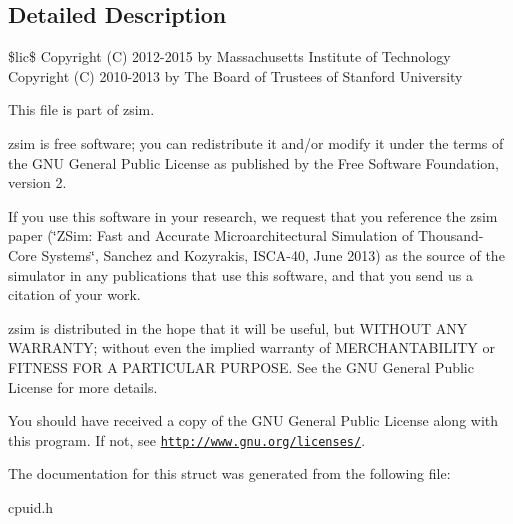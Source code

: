 \subsection{Detailed Description}
\$lic\$ Copyright (C) 2012-\/2015 by Massachusetts Institute of Technology Copyright (C) 2010-\/2013 by The Board of Trustees of Stanford University

This file is part of zsim.

zsim is free software; you can redistribute it and/or modify it under the terms of the G\-N\-U General Public License as published by the Free Software Foundation, version 2.

If you use this software in your research, we request that you reference the zsim paper (\char`\"{}\-Z\-Sim\-: Fast and Accurate Microarchitectural Simulation of
\-Thousand-\/\-Core Systems\char`\"{}, Sanchez and Kozyrakis, I\-S\-C\-A-\/40, June 2013) as the source of the simulator in any publications that use this software, and that you send us a citation of your work.

zsim is distributed in the hope that it will be useful, but W\-I\-T\-H\-O\-U\-T A\-N\-Y W\-A\-R\-R\-A\-N\-T\-Y; without even the implied warranty of M\-E\-R\-C\-H\-A\-N\-T\-A\-B\-I\-L\-I\-T\-Y or F\-I\-T\-N\-E\-S\-S F\-O\-R A P\-A\-R\-T\-I\-C\-U\-L\-A\-R P\-U\-R\-P\-O\-S\-E. See the G\-N\-U General Public License for more details.

You should have received a copy of the G\-N\-U General Public License along with this program. If not, see \href{http://www.gnu.org/licenses/}{\tt http\-://www.\-gnu.\-org/licenses/}. 

The documentation for this struct was generated from the following file\-:\begin{DoxyCompactItemize}
\item 
cpuid.\-h\end{DoxyCompactItemize}
